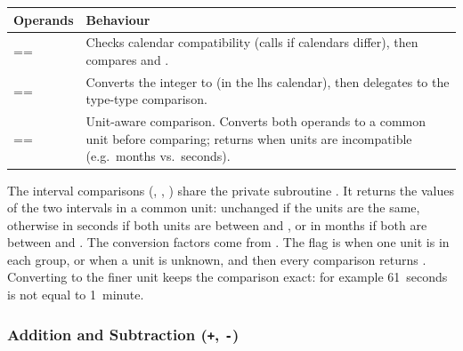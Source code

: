 \begin{longtable}{L{5cm} L{9cm}}
  \toprule
  \textbf{Operands} & \textbf{Behaviour} \\
  \midrule
  \endhead
  \bottomrule
  \endfoot
   ==  &
    Checks calendar compatibility (calls  if calendars differ), then
    compares  and . \\
   ==  &
    Converts the integer to  (in the lhs calendar),
    then delegates to the type-type comparison. \\
   ==  &
    Unit-aware comparison. Converts both operands to a common unit before
    comparing; returns  when units are incompatible
    (e.g.\ months vs.\ seconds). \\
\end{longtable}

The interval comparisons (\code{==}, \code{>}, \code{<}) share the private
subroutine . It returns the values of
the two intervals in a common unit: unchanged if the units are the same,
otherwise in seconds if both units are between  and ,
or in months if both are between  and . The
conversion factors come from . The flag  is
 when one unit is in each group, or when a unit is unknown,
and then every comparison returns . Converting to the finer
unit keeps the comparison exact: for example 61~seconds is not equal to
1~minute.

\subsubsection{Addition and Subtraction (\texttt{+}, \texttt{-})}

